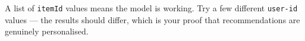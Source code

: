 \begin{Shaded}
\begin{Highlighting}[]
\DataTypeTok{\textbackslash{}}
   \OperatorTok{\textless{}}\OperatorTok{\textgreater{}} \DataTypeTok{\textbackslash{}}
  \DataTypeTok{\textbackslash{}}
\end{Highlighting}
\end{Shaded}

A list of \texttt{itemId} values means the model is working. Try a few
different \texttt{user-id} values --- the results should differ, which
is your proof that recommendations are genuinely personalised.
